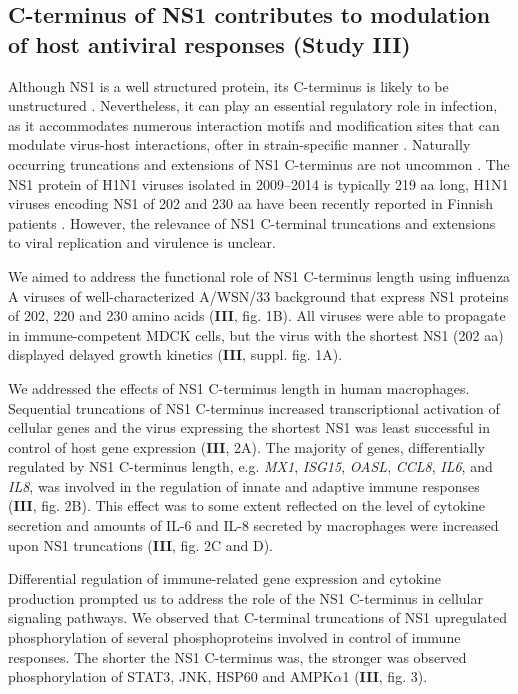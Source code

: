 	\subsection{C-terminus of NS1 contributes to modulation of host antiviral responses (Study III)}
		
		Although NS1 is a well structured protein, its C-terminus is likely to be unstructured \parencite{Hale2008b}. Nevertheless, it can play an essential regulatory role in infection, as it accommodates numerous interaction motifs and modification sites that can modulate virus-host interactions, ofter in strain-specific manner \parencite{Liu2010, Marazzi2012, Li2001, Melen2012, Hsiang2012, Hsiang2009}. Naturally occurring truncations and extensions of NS1 C-terminus are not uncommon \parencite{Suarez1998}. The NS1 protein of H1N1 viruses isolated in 2009--2014 is typically 219 aa long, H1N1 viruses encoding NS1 of 202 and 230 aa have been recently reported in Finnish patients \parencite{Lakspere2014}. However, the relevance of NS1 C-terminal truncations and extensions to viral replication and virulence is unclear.
		
		We aimed to address the functional role of NS1 C-terminus length using influenza A viruses of well-characterized A/WSN/33 background that express NS1 proteins of 202, 220 and 230 amino acids (\textbf{III}, fig. 1B). All viruses were able to propagate in immune-competent MDCK cells, but the virus with the shortest NS1 (202 \gls{aa}) displayed delayed growth kinetics (\textbf{III}, suppl. fig. 1A). 
		
		We addressed the effects of NS1 C-terminus length in human macrophages. Sequential truncations of NS1 C-terminus increased transcriptional activation of cellular genes and the virus expressing the shortest NS1 was least successful in control of host gene expression (\textbf{III}, 2A). The majority of genes, differentially regulated by NS1 C-terminus length, e.g. \textit{MX1}, \textit{ISG15}, \textit{OASL}, \textit{CCL8}, \textit{IL6}, and \textit{IL8}, was involved in the regulation of innate and adaptive immune responses (\textbf{III}, fig. 2B).  This effect was to some extent reflected on the level of cytokine secretion and amounts of IL-6 and IL-8 secreted by macrophages were increased upon NS1 truncations (\textbf{III}, fig. 2C and D). 
		
		Differential regulation of immune-related gene expression and cytokine production prompted us to address the role of the NS1 C-terminus in cellular signaling pathways. We observed that C-terminal truncations of NS1 upregulated phosphorylation of several phosphoproteins involved in control of immune responses. The shorter the NS1 C-terminus was, the stronger was observed phosphorylation of STAT3, JNK, HSP60 and AMPK$\alpha$1 (\textbf{III}, fig. 3). 
				
